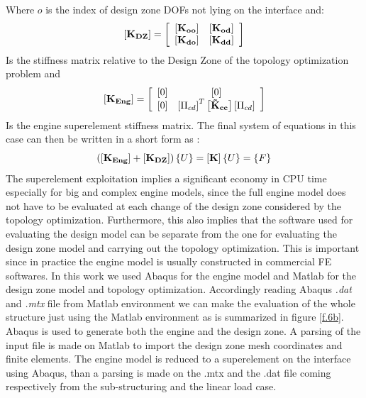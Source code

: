 Where $o$ is the index of design zone DOFs not lying on the interface and:
\begin{equation}
\left[{\mathbf{K_{DZ}}}\right]=\left[ \begin{array}{cc}
    \left[ \mathbf{K_{oo}} \right] & \left[ \mathbf{K_{od}} \right]\\
    \left[ \mathbf{K_{do}} \right] & \left[ \mathbf{K_{dd}} \right] 
    \end{array} \right] 
\end{equation}
Is the stiffness matrix relative to the Design Zone of the topology optimization problem and
\begin{equation}
\left[{\mathbf{K_{Eng}}}\right]=\left[ \begin{array}{cc}
    \left[ 0 \right] & \left[ 0 \right]\\
    \left[ 0 \right] & \left[ \Pi_{cd} \right]^T\left[ \mathbf{\tilde{K}_{cc}} \right]\left[ \Pi_{cd} \right] 
    \end{array} \right] 
\end{equation} 
Is the engine superelement stiffness matrix.
The final system of equations in this case can then be written in a short form as :
\begin{equation}
\left(\left[{\mathbf{K_{Eng}}}\right]+\left[{\mathbf{K_{DZ}}}\right]\right)\left\lbrace{U}\right \rbrace=\left[{\mathbf{K}}\right]\left\lbrace{U}\right \rbrace=\left\lbrace{F}\right \rbrace
\end{equation}
The superelement exploitation implies a significant economy in CPU time especially for big and complex engine models, since the full engine model does not have to be evaluated at each change of the design zone considered by the topology optimization. Furthermore, this also implies that the software used for evaluating the design model can be separate from the one for evaluating the design zone model and carrying out the topology optimization. This is important since in practice the engine model is usually constructed in commercial FE softwares. In this work we used Abaqus for the engine model and Matlab for the design zone model and topology optimization. Accordingly reading Abaqus \textit{.dat} and \textit{.mtx} file from Matlab environment we can make the evaluation of the whole structure just using the Matlab environment as is summarized in figure \ref{f.6b}. Abaqus is used to generate both the engine and the design zone. A parsing of the input file is made on Matlab to import the design zone mesh coordinates and finite elements. The engine model is reduced to a superelement on the interface using Abaqus, than a parsing is made on the .mtx and the .dat file coming respectively from the sub-structuring and the linear load case. 

